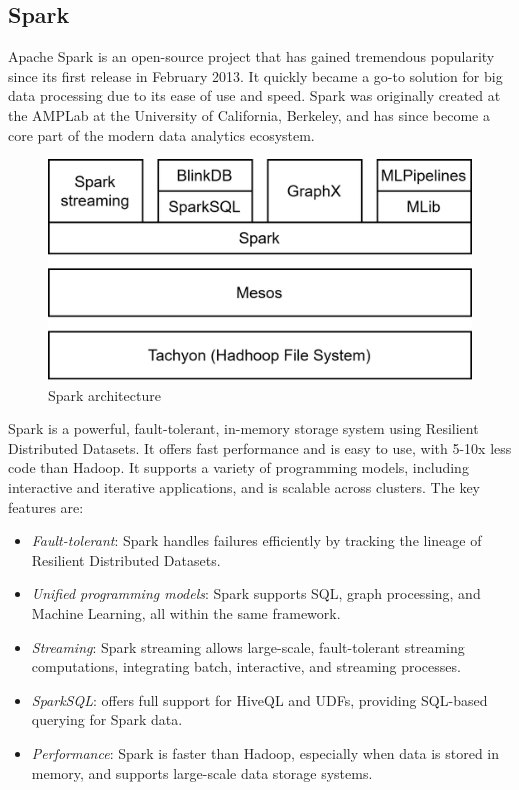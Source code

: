 \subsection{Spark}
Apache Spark is an open-source project that has gained tremendous popularity since its first release in February 2013. 
It quickly became a go-to solution for big data processing due to its ease of use and speed. 
Spark was originally created at the AMPLab at the University of California, Berkeley, and has since become a core part of the modern data analytics ecosystem.
\begin{figure}[H]
    \centering
    \includegraphics[width=0.75\linewidth]{images/spark.png}
    \caption{Spark architecture}
\end{figure}
Spark is a powerful, fault-tolerant, in-memory storage system using Resilient Distributed Datasets.
It offers fast performance and is easy to use, with 5-10x less code than Hadoop. 
It supports a variety of programming models, including interactive and iterative applications, and is scalable across clusters.
The key features are: 
\begin{itemize}
    \item \textit{Fault-tolerant}: Spark handles failures efficiently by tracking the lineage of Resilient Distributed
Datasets.
    \item \textit{Unified programming models}: Spark supports SQL, graph processing, and Machine Learning, all within the same framework.
    \item \textit{Streaming}: Spark streaming allows large-scale, fault-tolerant streaming computations, integrating batch, interactive, and streaming processes.
    \item \textit{SparkSQL}: offers full support for HiveQL and UDFs, providing SQL-based querying for Spark data.
    \item \textit{Performance}: Spark is faster than Hadoop, especially when data is stored in memory, and supports large-scale data storage systems.
\end{itemize}
